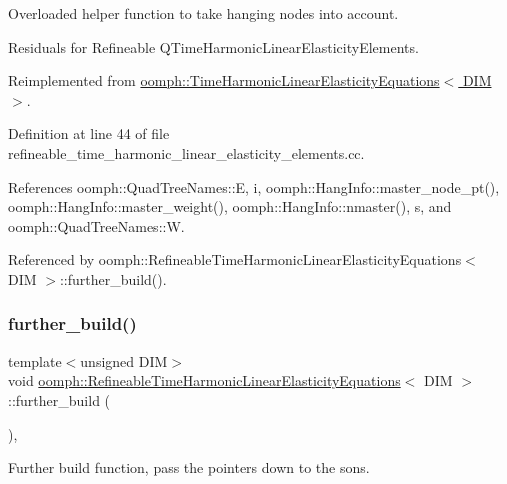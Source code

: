 Overloaded helper function to take hanging nodes into account. 

Residuals for Refineable Q\+Time\+Harmonic\+Linear\+Elasticity\+Elements. 

Reimplemented from \hyperlink{classoomph_1_1TimeHarmonicLinearElasticityEquations_a1cbce23da8fa56642335a45651133a2a}{oomph\+::\+Time\+Harmonic\+Linear\+Elasticity\+Equations$<$ D\+I\+M $>$}.



Definition at line 44 of file refineable\+\_\+time\+\_\+harmonic\+\_\+linear\+\_\+elasticity\+\_\+elements.\+cc.



References oomph\+::\+Quad\+Tree\+Names\+::E, i, oomph\+::\+Hang\+Info\+::master\+\_\+node\+\_\+pt(), oomph\+::\+Hang\+Info\+::master\+\_\+weight(), oomph\+::\+Hang\+Info\+::nmaster(), s, and oomph\+::\+Quad\+Tree\+Names\+::W.



Referenced by oomph\+::\+Refineable\+Time\+Harmonic\+Linear\+Elasticity\+Equations$<$ D\+I\+M $>$\+::further\+\_\+build().

\mbox{\label{classoomph_1_1RefineableTimeHarmonicLinearElasticityEquations_a750d40e1fd9377cd428dfe599bf93a84}} 
\subsubsection{\texorpdfstring{further\+\_\+build()}{further\_build()}}
{\footnotesize\ttfamily template$<$unsigned D\+IM$>$ \\
void \hyperlink{classoomph_1_1RefineableTimeHarmonicLinearElasticityEquations}{oomph\+::\+Refineable\+Time\+Harmonic\+Linear\+Elasticity\+Equations}$<$ D\+IM $>$\+::further\+\_\+build (\begin{DoxyParamCaption}{ }\end{DoxyParamCaption})\hspace{0.3cm}{\ttfamily [inline]}, {\ttfamily [virtual]}}



Further build function, pass the pointers down to the sons. 



